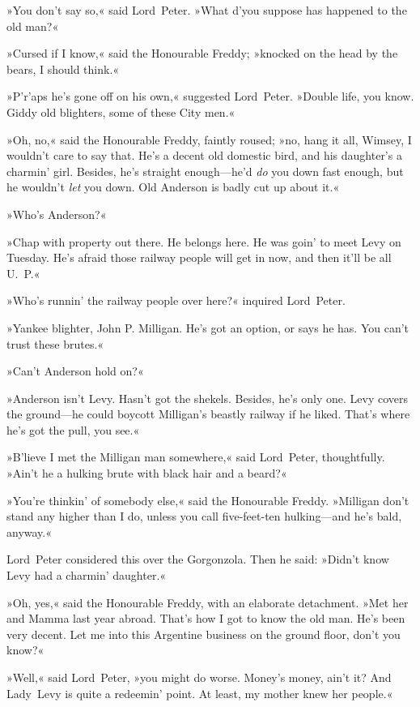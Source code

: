 »You don't say so,« said Lord~Peter. »What d'you suppose has happened to the old man?«

»Cursed if I know,« said the Honourable Freddy; »knocked on the head by the bears, I should think.«

»P'r'aps he's gone off on his own,« suggested Lord~Peter. »Double life, you know. Giddy old blighters, some of these City men.«

»Oh, no,« said the Honourable Freddy, faintly roused; »no, hang it all, Wimsey, I wouldn't care to say that. He's a decent old domestic bird, and his daughter's a charmin' girl. Besides, he's straight enough—he'd \textit{do} you down fast enough, but he wouldn't \textit{let} you down. Old Anderson is badly cut up about it.«

»Who's Anderson?«

»Chap with property out there. He belongs here. He was goin' to meet Levy on Tuesday. He's afraid those railway people will get in now, and then it'll be all U\@.~P\@.«

»Who's runnin' the railway people over here?« inquired Lord~Peter.

»Yankee blighter, John P\@. Milligan. He's got an option, or says he has. You can't trust these brutes.«

»Can't Anderson hold on?«

»Anderson isn't Levy. Hasn't got the shekels. Besides, he's only one. Levy covers the ground—he could boycott Milligan's beastly railway if he liked. That's where he's got the pull, you see.«

»B'lieve I met the Milligan man somewhere,« said Lord~Peter, thoughtfully. »Ain't he a hulking brute with black hair and a beard?«

»You're thinkin' of somebody else,« said the Honourable Freddy. »Milligan don't stand any higher than I do, unless you call five-feet-ten hulking—and he's bald, anyway.«

Lord~Peter considered this over the Gorgonzola. Then he said: »Didn't know Levy had a charmin' daughter.«

»Oh, yes,« said the Honourable Freddy, with an elaborate detachment. »Met her and Mamma last year abroad. That's how I got to know the old man. He's been very decent. Let me into this Argentine business on the ground floor, don't you know?«

»Well,« said Lord~Peter, »you might do worse. Money's money, ain't it? And Lady~Levy is quite a redeemin' point. At least, my mother knew her people.«

